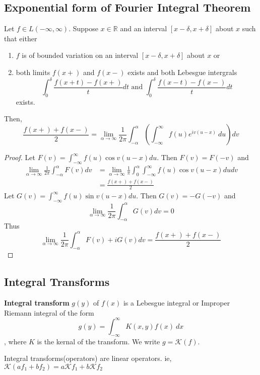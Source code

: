 \subsection{Exponential form of Fourier Integral Theorem}
Let \( f \in L(-\infty,\infty) \).
Suppose \( x \in \mathbb{R} \) and an interval $[x-\delta,x+\delta]$ about $x$ such that either 
\begin{enumerate}
	\item $f$ is of bounded variation on an interval $[x-\delta,x+\delta]$ about $x$ or
	\item both limits $f(x+)$ and $f(x-)$ exists and both Lebesgue intergrals
	\[ \int_0^\delta \frac{f(x+t)-f(x+)}{t} dt \text{ and }\int_0^\delta \frac{f(x-t)-f(x-)}{t} dt \] exists.
\end{enumerate}
Then, \[ \frac{f(x+)+f(x-)}{2} = \lim_{\alpha \to \infty} \frac{1}{2\pi} \int_{-\alpha}^\alpha \left( \int_{-\infty}^\infty f(u) e^{iv(u-x)}\ du\right) dv \]
\begin{proof}
Let \( F(v) = \int_{-\infty}^\infty f(u) \cos v(u-x) du \).
Then \( F(v) = F(-v) \) and 
\begin{align*}
	\lim_{\alpha \to \infty} \frac{1}{2\pi} \int_{-\alpha}^\alpha F(v) dv
	& = \lim_{\alpha \to \infty} \frac{1}{\pi} \int_0^\alpha \int_{-\infty}^\infty f(u) \cos v(u-x) du dv\\
	& = \frac{f(x+)+f(x-)}{2}
\end{align*}
Let \( G(v) = \int_{-\infty}^\infty f(u) \sin v(u-x) du \).
Then \( G(v) = -G(-v) \) and
\[ \lim_{\alpha \to \infty} \frac{1}{2\pi} \int_{-\alpha}^\alpha G(v) dv = 0 \]
Thus \[ \lim_{\alpha \to \infty} \frac{1}{2\pi} \int_{-\alpha}^\alpha F(v) + iG(v) dv = \frac{f(x+)+f(x-)}{2} \]
\end{proof}

\subsection{Integral Transforms}
\begin{definition}
	\textbf{Integral transform} $g(y)$ of $f(x)$ is a Lebesgue integral or Improper Riemann integral of the form
	\[ g(y) = \int_{-\infty}^\infty K(x,y) f(x)\ dx \], where $K$ is the kernal of the transform.
	We write \( g = \mathscr{K}(f) \).
\end{definition}

\begin{remark}
	Integral transforms(operators) are linear operators.
	 ie, \( \mathscr{K}(af_1 + bf_2) = a\mathscr{K}f_1 + b\mathscr{K}f_2 \)
\end{remark}

